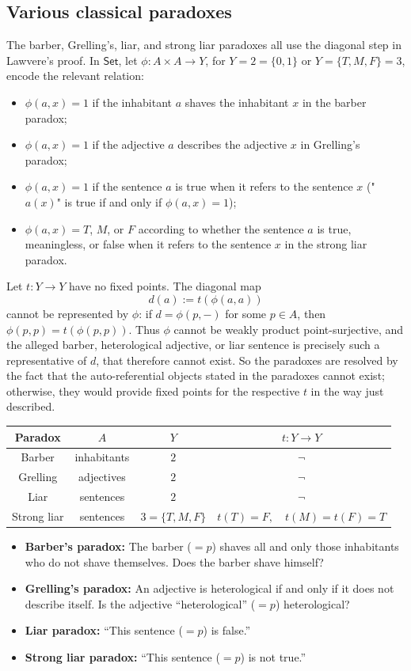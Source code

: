 \subsection*{Various classical paradoxes}
The barber, Grelling's, liar, and strong liar paradoxes all use the diagonal step in Lawvere's proof. In $\mathsf{Set}$, let $\phi : A\times A\to Y$, for $Y = 2 = \{0,1\}$ or $Y = \{T,M,F\} = 3$, encode the relevant relation:
\begin{itemize}[label=*]
    \item $\phi(a,x) = 1$ if the inhabitant $a$ shaves the inhabitant $x$ in the barber paradox;
    \item $\phi(a,x) = 1$ if the adjective $a$ describes the adjective $x$ in Grelling's paradox;
    \item $\phi(a,x) = 1$ if the sentence $a$ is true when it refers to the sentence $x$ ("$a(x)$" is true if and only if $\phi(a,x) = 1$);
    \item $\phi(a,x) = T$, $M$, or $F$ according to whether the sentence $a$ is true, meaningless, or false when it refers to the sentence $x$ in the strong liar paradox.
\end{itemize}
Let $t : Y\to Y$ have no fixed points. The diagonal map
\[ d(a) := t(\phi(a,a)) \]
cannot be represented by $\phi$: if $d = \phi(p,-)$ for some $p\in A$, then $\phi(p,p) = t(\phi(p,p))$. Thus $\phi$ cannot be weakly product point-surjective, and the alleged barber, heterological adjective, or liar sentence is precisely such a representative of $d$,
that therefore cannot exist. So the paradoxes are resolved by the fact that the auto-referential objects stated in the paradoxes cannot exist; otherwise, they would provide fixed points for the respective $t$ in the way just described.
\begin{center}
    \small
    \begin{tabular}{c|c|c|c}
        \textbf{Paradox} & $A$ & $Y$ & $t : Y\to Y$ \\
        \hline
        Barber & inhabitants & $2$ & $\neg$ \\
        Grelling & adjectives & $2$ & $\neg$ \\
        Liar & sentences & $2$ & $\neg$ \\
        Strong liar & sentences & $3=\{T,M,F\}$ & $t(T)=F,\quad t(M)=t(F)=T$
    \end{tabular}
\end{center}
\begin{itemize}[leftmargin=*,nosep]
    \item \textbf{Barber's paradox:} The barber ($= p$) shaves all and only those inhabitants who do not shave themselves. Does the barber shave himself?
    \item \textbf{Grelling's paradox:} An adjective is heterological if and only if it does not describe itself. Is the adjective ``heterological'' ($= p$) heterological?
    \item \textbf{Liar paradox:} ``This sentence ($= p$) is false.''
    \item \textbf{Strong liar paradox:} ``This sentence ($= p$) is not true.''
\end{itemize}

